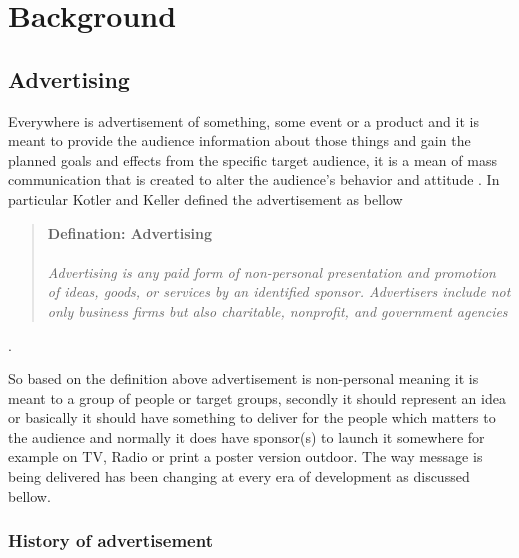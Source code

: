 
\chapter{Background} %

\label{Chapter2} %
\newpage

\section{Advertising}

Everywhere is advertisement of something, some event or a product and it is meant to provide the audience information about those things and gain the planned goals and effects from the specific target audience, it is a mean of mass communication that is created to alter the audience’s behavior and attitude \cite{advertisementdef}. In particular Kotler and Keller defined the advertisement as bellow

\begin{snugshade}
\begin{quote}\textbf{Defination: Advertising }\\ \\ \emph{Advertising is any paid form of non-personal presentation and promotion of ideas, goods, or services by an identified sponsor. Advertisers include not only business firms but also charitable, nonprofit, and government agencies}\end{quote}\cite{ad_def}.
\end{snugshade}

So based on the definition above advertisement is non-personal meaning it is meant to a group of people or target groups, secondly it should represent an idea or basically it should have something to deliver for the people which matters to the audience and normally it does have sponsor(s) to launch it somewhere for example on TV, Radio or print a poster version outdoor. The way message is being delivered has been changing at every era of development as discussed bellow.



\subsection{History of advertisement}

